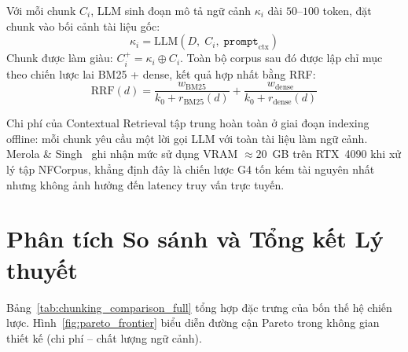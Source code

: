 \documentclass[12pt,a4paper]{report}
\theoremstyle{plain}
\theoremstyle{definition}
\begin{document}
	Với mỗi chunk $C_i$, LLM sinh đoạn mô tả ngữ cảnh $\kappa_i$ dài
	$50$--$100$ token, đặt chunk vào bối cảnh tài liệu gốc:
	\begin{equation}
		\kappa_i = \text{LLM}(D,\; C_i,\; \texttt{prompt}_{\text{ctx}})
		\label{eq:contextualize}
	\end{equation}
	Chunk được làm giàu: $C_i^+ = \kappa_i \oplus C_i$. Toàn bộ corpus sau
	đó được lập chỉ mục theo chiến lược lai BM25 + dense, kết quả hợp nhất
	bằng RRF:
	\begin{equation}
		\text{RRF}(d) = \frac{w_{\text{BM25}}}{k_0 + r_{\text{BM25}}(d)}
		+ \frac{w_{\text{dense}}}{k_0 + r_{\text{dense}}(d)}
		\label{eq:rrf}
	\end{equation}
	
	Chi phí của Contextual Retrieval tập trung hoàn toàn ở giai đoạn indexing
	offline: mỗi chunk yêu cầu một lời gọi LLM với toàn tài liệu làm ngữ cảnh.
	Merola \& Singh~\cite{merola2025reconstructing} ghi nhận mức sử dụng VRAM
	$\approx 20$~GB trên RTX~4090 khi xử lý tập NFCorpus, khẳng định đây là
	chiến lược G4 tốn kém tài nguyên nhất nhưng không ảnh hưởng đến latency
	truy vấn trực tuyến.
	
	\section{Phân tích So sánh và Tổng kết Lý thuyết}
	\label{sec:theory_comparison}
	
	Bảng~\ref{tab:chunking_comparison_full} tổng hợp đặc trưng của bốn thế hệ
	chiến lược. Hình~\ref{fig:pareto_frontier} biểu diễn đường cận Pareto trong
	không gian thiết kế (chi phí -- chất lượng ngữ cảnh).
	
\end{document}
